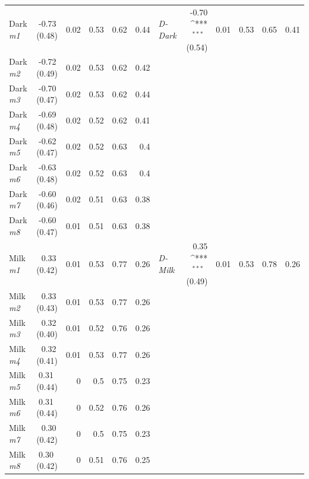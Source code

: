 \documentclass[12pt]{book}
\def\sym#1{\ifmmode^{#1}\else\(^{#1}\)\fi}
\begin{document}
\begin{landscape}
\begin{table}
{\begin{tabular}{p{1.5cm} D{,}{.}{1} D{,}{.}{1} D{,}{.}{1}  D{,}{.}{1}  D{,}{.}{1}  p{1.5cm}  D{,}{.}{1}  D{,}{.}{1}  D{,}{.}{1}  D{,}{.}{1}  D{,}{.}{1} }
Dark \emph{m1}  	 & 	  -0.73\, (0.48)   	  & 	0.02	  & 	0.53	  & 	0.62	  & 	0.44	 & 	\emph{D-Dark}   	 & 	  -0.70 \sym{***} \, (0.54)   	  & 	0.01	  & 	0.53	  & 	0.65	  & 	0.41	  \\
Dark \emph{m2}  	 & 	  -0.72\, (0.49)   	  & 	0.02	  & 	0.53	  & 	0.62	  & 	0.42	 & 		 & 		  & 		  & 		  & 		  & 		  \\
Dark \emph{m3}  	 & 	  -0.70\, (0.47)   	  & 	0.02	  & 	0.53	  & 	0.62	  & 	0.44	 & 		 & 		  & 		  & 		  & 		  & 		  \\
Dark \emph{m4}  	 & 	  -0.69\, (0.48)   	  & 	0.02	  & 	0.52	  & 	0.62	  & 	0.41	 & 		 & 		  & 		  & 		  & 		  & 		  \\
Dark \emph{m5}  	 & 	  -0.62\, (0.47)   	  & 	0.02	  & 	0.52	  & 	0.63	  & 	0.4	 & 		 & 		  & 		  & 		  & 		  & 		  \\
Dark \emph{m6}  	 & 	  -0.63\, (0.48)  	  & 	0.02	  & 	0.52	  & 	0.63	  & 	0.4	 & 		 & 		  & 		  & 		  & 		  & 		  \\
Dark \emph{m7}  	 & 	  -0.60\, (0.46)   	  & 	0.02	  & 	0.51	  & 	0.63	  & 	0.38	 & 		 & 		  & 		  & 		  & 		  & 		  \\
Dark \emph{m8}  	 & 	  -0.60\, (0.47)   	  & 	0.01	  & 	0.51	  & 	0.63	  & 	0.38	 & 		 & 		  & 		  & 		  & 		  & 		  \\
Milk \emph{m1}  	 & 	  0.33\, (0.42)   	  & 	0.01	  & 	0.53	  & 	0.77	  & 	0.26	 & 	\emph{D-Milk}   	 & 	  0.35 \sym{***} \, (0.49)  	  & 	0.01	  & 	0.53	  & 	0.78	  & 	0.26	  \\
Milk \emph{m2}  	 & 	  0.33\, (0.43)  	  & 	0.01	  & 	0.53	  & 	0.77	  & 	0.26	 & 		 & 		  & 		  & 		  & 		  & 		  \\
Milk \emph{m3}  	 & 	  0.32\, (0.40)  	  & 	0.01	  & 	0.52	  & 	0.76	  & 	0.26	 & 		 & 		  & 		  & 		  & 		  & 		  \\
Milk \emph{m4}  	 & 	  0.32\, (0.41)   	  & 	0.01	  & 	0.53	  & 	0.77	  & 	0.26	 & 		 & 		  & 		  & 		  & 		  & 		  \\
Milk \emph{m5}  	 & 	  0.31 \,(0.44)   	  & 	0	  & 	0.5	  & 	0.75	  & 	0.23	 & 		 & 		  & 		  & 		  & 		  & 		  \\
Milk \emph{m6}  	 & 	  0.31 \, (0.44)  	  & 	0	  & 	0.52	  & 	0.76	  & 	0.26	 & 		 & 		  & 		  & 		  & 		  & 		  \\
Milk \emph{m7}  	 & 	  0.30\, (0.42)  	  & 	0	  & 	0.5	  & 	0.75	  & 	0.23	 & 		 & 		  & 		  & 		  & 		  & 		  \\
Milk \emph{m8}  	 & 	  0.30 \, (0.42)  	  & 	0	  & 	0.51	  & 	0.76	  & 	0.25	 & 		 & 		  & 		  & 		  & 		  & 		  \\



\end{tabular}}
\end{table}
\end{landscape}
\end{document}
